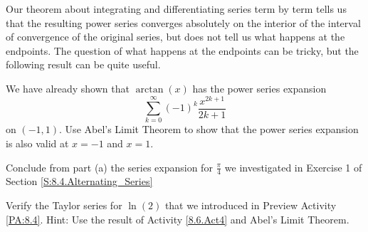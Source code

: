 \begin{activity} \label{8.6.Act5} Our theorem about integrating and differentiating series term by term tells us that the resulting power series converges absolutely on the interior of the interval of convergence of the original series, but does not tell us what happens at the endpoints. The question of what happens at the endpoints can be tricky, but the following result can be quite useful.

\vspace*{5pt}
\nin {}
\vspace*{1pt}

\ba
\item We have already shown that $\arctan(x)$ has the power series expansion
\begin{equation} \label{eq:A8.6.4_arctan}
\sum_{k=0}^{\infty} (-1)^k\frac{x^{2k+1}}{2k+1}
\end{equation}
on $(-1,1)$. Use Abel's Limit Theorem to show that the power series expansion is also valid at $x=-1$ and $x=1$.
\item Conclude from part (a) the series expansion for $\frac{\pi}{4}$ we investigated in Exercise 1 of Section \ref{S:8.4.Alternating_Series}
\item Verify the Taylor series for $\ln(2)$ that we introduced in Preview Activity \ref{PA:8.4}. Hint: Use the result of Activity \ref{8.6.Act4} and Abel's Limit Theorem.
\ea


\end{activity}

